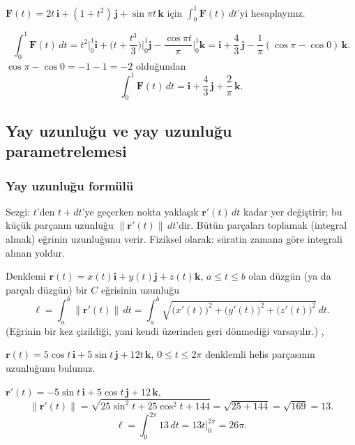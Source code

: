 \begin{soru}
$\mathbf F(t)=2t\,\mathbf i+(1+t^2)\,\mathbf j+\sin\pi t\,\mathbf k$ için $\displaystyle\int_0^1\mathbf F(t)\,dt$'yi hesaplayınız.
\end{soru}
\begin{cevap}
\[ \int_0^1\mathbf F(t)\,dt=t^2\Big|_0^1\mathbf i+\Big(t+\frac{t^3}{3}\Big)\Big|_0^1\mathbf j-\frac{\cos\pi t}{\pi}\Big|_0^1\mathbf k
=\mathbf i+\frac43\,\mathbf j-\frac1\pi(\cos\pi-\cos0)\,\mathbf k . \]
$\cos\pi-\cos0=-1-1=-2$ olduğundan
\[ \int_0^1\mathbf F(t)\,dt=\mathbf i+\frac43\,\mathbf j+\frac2\pi\,\mathbf k . \]
\end{cevap}

\subsection{Yay uzunluğu ve yay uzunluğu parametrelemesi}

\subsubsection{Yay uzunluğu formülü}

Sezgi: $t$'den $t+dt$'ye geçerken nokta yaklaşık $\mathbf r'(t)\,dt$ kadar yer değiştirir; bu küçük parçanın uzunluğu
$\|\mathbf r'(t)\|\,dt$'dir. Bütün parçaları toplamak (integral almak) eğrinin uzunluğunu verir. Fiziksel olarak: süratin
zamana göre integrali alınan yoldur.

\begin{teorem}
Denklemi $\mathbf r(t)=x(t)\mathbf i+y(t)\mathbf j+z(t)\mathbf k$, $a\le t\le b$ olan düzgün (ya da parçalı düzgün) bir $C$ eğrisinin
uzunluğu
\[ \ell=\int_a^b\|\mathbf r'(t)\|\,dt=\int_a^b\sqrt{\big(x'(t)\big)^2+\big(y'(t)\big)^2+\big(z'(t)\big)^2}\,dt . \]
(Eğrinin bir kez çizildiği, yani kendi üzerinden geri dönmediği varsayılır.) , 
\end{teorem}

\begin{soru}
$\mathbf r(t)=5\cos t\,\mathbf i+5\sin t\,\mathbf j+12t\,\mathbf k$, $0\le t\le2\pi$ denklemli helis parçasının uzunluğunu bulunuz.
\end{soru}
\begin{cevap}
$\mathbf r'(t)=-5\sin t\,\mathbf i+5\cos t\,\mathbf j+12\,\mathbf k$,
\[ \|\mathbf r'(t)\|=\sqrt{25\sin^2t+25\cos^2t+144}=\sqrt{25+144}=\sqrt{169}=13 . \]
\[ \ell=\int_0^{2\pi}13\,dt=13t\Big|_0^{2\pi}=26\pi . \]
\end{cevap}

